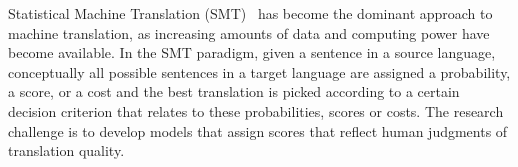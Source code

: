 





Statistical Machine Translation (SMT)~\citep{brown-dellapietra-dellapietra-mercer-1993,lopez:2008:ACMComputingSurveys,koehn:2010:book}
has become the dominant approach to machine translation, as increasing
amounts of data and computing power have become available.
In the SMT paradigm, given a sentence in a source language,
conceptually all
possible sentences in a target language are assigned a probability, a
score, or a cost and the best translation is picked according to a certain
decision criterion that relates to these probabilities, scores or costs.
The research challenge is to develop models that assign scores that
reflect human judgments of translation quality.


